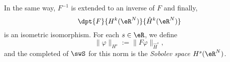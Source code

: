 In the same way, $F^{-1}$ is extended to an inverse of $F$ and finally,
\[ 
  \dpt{ F }{ H^k(\eR^N) }{ \hat H^k(\eR^N) }
\]
is  an isometric isomorphism. For each $s\in\eR$, we define
\begin{equation}
  \| \varphi \|_{H^s}:=\| F\varphi \|_{\hat H^s},
\end{equation}
and the completed of $\swS$ for this norm is the \emph{Sobolev space} $H^s(\eR^N)$.


